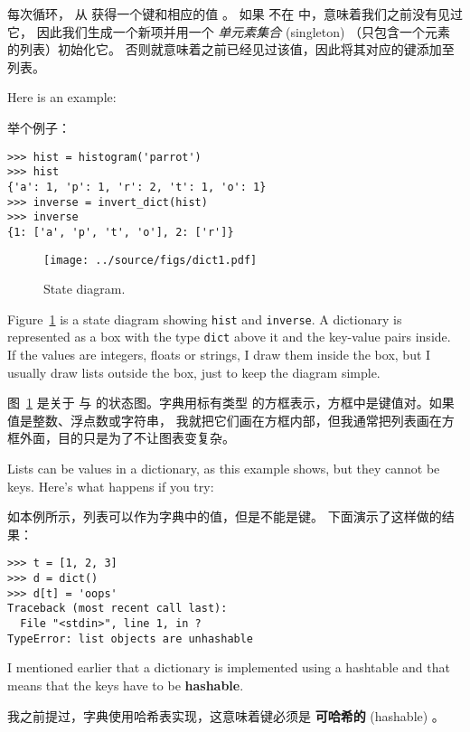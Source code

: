 每次循环，  从  获得一个键和相应的值  。
如果  不在  中，意味着我们之前没有见过它，
因此我们生成一个新项并用一个 {\em 单元素集合} (singleton) （只包含一个元素的列表）初始化它。 否则就意味着之前已经见过该值，因此将其对应的键添加至列表。

Here is an example:

举个例子：

\begin{lstlisting}
>>> hist = histogram('parrot')
>>> hist
{'a': 1, 'p': 1, 'r': 2, 't': 1, 'o': 1}
>>> inverse = invert_dict(hist)
>>> inverse
{1: ['a', 'p', 't', 'o'], 2: ['r']}
\end{lstlisting}

\begin{figure}
\centerline
{\texttt{[image: ../source/figs/dict1.pdf]}}
\caption{State diagram.}
\label{fig.dict1}
\end{figure}

Figure~\ref{fig.dict1} is a state diagram showing {\tt hist} and {\tt inverse}.
A dictionary is represented as a box with the type {\tt dict} above it
and the key-value pairs inside.  If the values are integers, floats or
strings, I draw them inside the box, but I usually draw lists
outside the box, just to keep the diagram simple.

图~\ref{fig.dict1} 是关于  与  的状态图。字典用标有类型  的方框表示，方框中是键值对。如果值是整数、浮点数或字符串，
我就把它们画在方框内部，但我通常把列表画在方框外面，目的只是为了不让图表变复杂。

  

Lists can be values in a dictionary, as this example shows, but they
cannot be keys.  Here's what happens if you try:

如本例所示，列表可以作为字典中的值，但是不能是键。
下面演示了这样做的结果：

  

\begin{lstlisting}
>>> t = [1, 2, 3]
>>> d = dict()
>>> d[t] = 'oops'
Traceback (most recent call last):
  File "<stdin>", line 1, in ?
TypeError: list objects are unhashable
\end{lstlisting}

%
I mentioned earlier that a dictionary is implemented using
a hashtable and that means that the keys have to be {\bf hashable}.

我之前提过，字典使用哈希表实现，这意味着键必须是 {\bf 可哈希的} (hashable) 。

